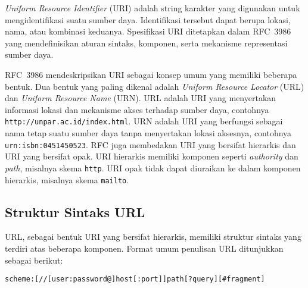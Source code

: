 
\textit{Uniform Resource Identifier} (URI) adalah string karakter yang digunakan untuk mengidentifikasi suatu sumber daya. Identifikasi tersebut dapat berupa lokasi, nama, atau kombinasi keduanya. Spesifikasi URI ditetapkan dalam RFC~3986 yang mendefinisikan aturan sintaks, komponen, serta mekanisme representasi sumber daya.

RFC~3986 mendeskripsikan URI sebagai konsep umum yang memiliki beberapa bentuk. Dua bentuk yang paling dikenal adalah \textit{Uniform Resource Locator} (URL) dan \textit{Uniform Resource Name} (URN). URL adalah URI yang menyertakan informasi lokasi dan mekanisme akses terhadap sumber daya, contohnya \texttt{http://unpar.ac.id/index.html}. URN adalah URI yang berfungsi sebagai nama tetap suatu sumber daya tanpa menyertakan lokasi aksesnya, contohnya \texttt{urn:isbn:0451450523}. RFC juga membedakan URI yang bersifat hierarkis dan URI yang bersifat opak. URI hierarkis memiliki komponen seperti \textit{authority} dan \textit{path}, misalnya skema \texttt{http}. URI opak tidak dapat diuraikan ke dalam komponen hierarkis, misalnya skema \texttt{mailto}.

\subsection{Struktur Sintaks URL}
\label{subsec:0202-struktur-url}

URL, sebagai bentuk URI yang bersifat hierarkis, memiliki struktur sintaks yang terdiri atas beberapa komponen. Format umum penulisan URL ditunjukkan sebagai berikut:
\begin{center}
\texttt{scheme:[//[user:password@]host[:port]]path[?query][\#fragment]}
\end{center}

